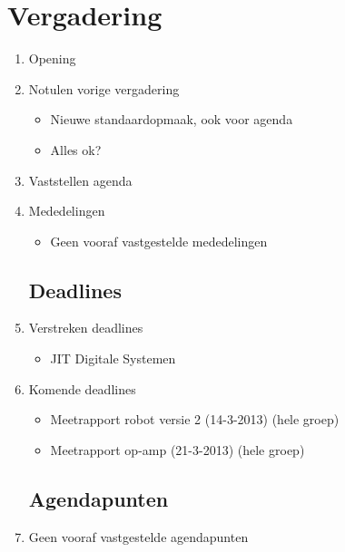 \documentclass{article}
\begin{document}
\section*{Vergadering}
\begin{enumerate}
	
	\subsection*{Vooraf}
	\item Opening
	\item Notulen vorige vergadering
	\begin{itemize}
		\item Nieuwe standaardopmaak, ook voor agenda
		\item Alles ok?
	\end{itemize}
	\item Vaststellen agenda
	\item Mededelingen
	\begin{itemize}
		\item Geen vooraf vastgestelde mededelingen
	\end{itemize}

	\subsection*{Deadlines}
	\item Verstreken deadlines
	\begin{itemize}
		\item JIT Digitale Systemen
	\end{itemize}
	\item Komende deadlines
	\begin{itemize}
		\item Meetrapport robot versie 2 (14-3-2013) (hele groep)
		\item Meetrapport op-amp (21-3-2013) (hele groep)
	\end{itemize}

	\subsection*{Agendapunten}
	\item Geen vooraf vastgestelde agendapunten	


\end{enumerate}
\end{document}
